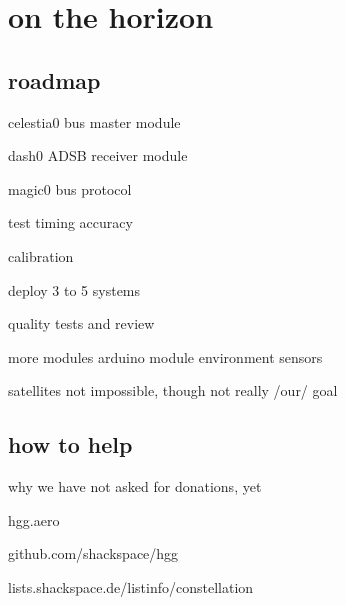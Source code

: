 \section{on the horizon}	

\subsection{roadmap}
	\begin{frame}{celestia0 bus master module}
	\end{frame}
	\begin{frame}{dash0 ADSB receiver module}
	\end{frame}
	\begin{frame}{magic0 bus protocol}
	\end{frame}
	\begin{frame}{test timing accuracy}
	\end{frame}
	\begin{frame}{calibration}
	\end{frame}
	\begin{frame}{deploy 3 to 5 systems}
	\end{frame}
	\begin{frame}{quality tests and review}
	\end{frame}
	\begin{frame}{more modules}
		arduino module
		environment sensors
	\end{frame}
	\begin{frame}{satellites}
		not impossible, though not really /our/ goal
	\end{frame}

\subsection{how to help}
	\begin{frame}{why we have not asked for donations, yet}
	\end{frame}
	\begin{frame}{hgg.aero}
	\end{frame}
	\begin{frame}{github.com/shackspace/hgg}
	\end{frame}
	\begin{frame}{lists.shackspace.de/listinfo/constellation}
	\end{frame}



